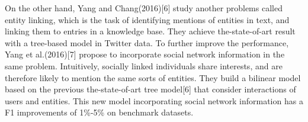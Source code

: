 On the other hand, Yang and Chang(2016)[6] study another problems called entity linking, which is the task of identifying mentions
of entities in text, and linking them to entries in a knowledge base. They achieve the-state-of-art result with a tree-based model in Twitter data.  To further improve the performance, Yang et al.(2016)[7] propose to incorporate social network information in the same problem. Intuitively, socially linked individuals share interests, and are therefore likely to mention the same sorts of entities. They build a bilinear model based on the previous the-state-of-art tree model[6] that consider interactions of users and entities. This new model incorporating social network information has a F1 improvements of 1\%-5\% on benchmark datasets.